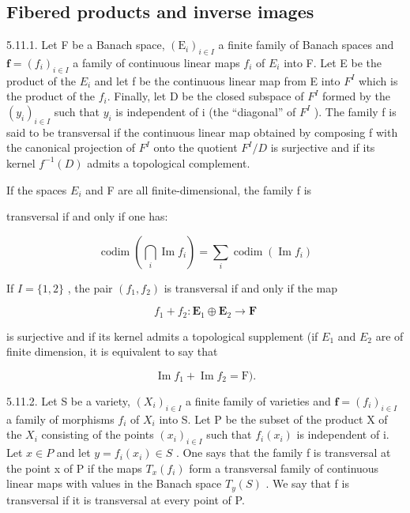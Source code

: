 \subsection{Fibered products and inverse images}

5.11.1. Let F be a Banach space, \((\mathrm{E}_{i})_{i\in I}\) a finite family of Banach spaces and \(\mathbf{f}=(f_{i})_{i\in I}\) a family of continuous linear maps \(f_{i}\) of \(E_{i}\) into F. Let E be the product of the \(E_{i}\) and let f be the continuous linear map from E into \(F^{I}\) which is the product of the \(f_{i}\). Finally, let D be the closed subspace of \(F^{I}\) formed by the \((y_{i})_{i\in I}\) such that \(y_{i}\) is independent of i (the “diagonal” of \(F^{I}\) ). The family f is said to be transversal if the continuous linear map obtained by composing f with the canonical projection of \(F^{I}\) onto the quotient \(F^{I}/D\) is surjective and if its kernel \(f^{-1}(D)\) admits a topological complement.

If the spaces \(E_{i}\) and F are all finite-dimensional, the family f is

transversal if and only if one has:

\[
\operatorname{codim} \left(\bigcap_ {i} \operatorname{Im} f _ {i}\right) = \sum_ {i} \operatorname{codim} \left(\operatorname{Im} f _ {i}\right)
\]

If \(I = \{1, 2\}\) , the pair \((f_1, f_2)\) is transversal if and only if the map

\[
f _ {1} + f _ {2}: \mathbf {E} _ {1} \oplus \mathbf {E} _ {2} \rightarrow \mathbf {F}
\]

is surjective and if its kernel admits a topological supplement (if \(E_{1}\) and \(E_{2}\) are of finite dimension, it is equivalent to say that

\[
\operatorname{Im} f _ {1} + \operatorname{Im} f _ {2} = \mathrm{F}).
\]

5.11.2. Let S be a variety, \((X_{i})_{i\in I}\) a finite family of varieties and \(\mathbf{f}=(f_{i})_{i\in I}\) a family of morphisms \(f_{i}\) of \(X_{i}\) into S. Let P be the subset of the product X of the \(X_{i}\) consisting of the points \((x_{i})_{i\in I}\) such that \(f_{i}(x_{i})\) is independent of i. Let \(x\in P\) and let \(y=f_{i}(x_{i})\in S\) . One says that the family f is transversal at the point x of P if the maps \(T_{x}(f_{i})\) form a transversal family of continuous linear maps with values in the Banach space \(T_{y}(S)\) . We say that f is transversal if it is transversal at every point of P.

